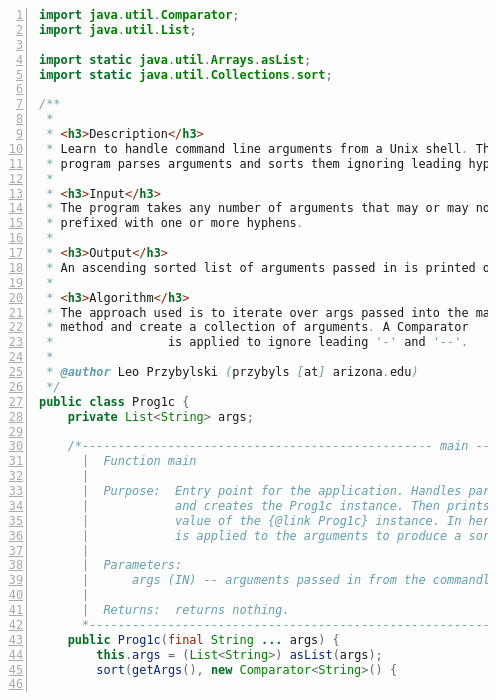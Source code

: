 \documentclass[11pt,notitlepage]{article}
\begin{document}
\begin{lstlisting}[numbers=left,language=java,basicstyle=\scriptsize,backgroundcolor=\color{ubergray},caption={trnapp-config.xml},frame=single,breaklines=true]
import java.util.Comparator;
import java.util.List;

import static java.util.Arrays.asList;
import static java.util.Collections.sort;

/**
 *
 * <h3>Description</h3>
 * Learn to handle command line arguments from a Unix shell. The
 * program parses arguments and sorts them ignoring leading hyphens
 *
 * <h3>Input</h3>  
 * The program takes any number of arguments that may or may not be
 * prefixed with one or more hyphens.
 *
 * <h3>Output</h3>  
 * An ascending sorted list of arguments passed in is printed out.
 *
 * <h3>Algorithm</h3>
 * The approach used is to iterate over args passed into the main
 * method and create a collection of arguments. A Comparator
 *                is applied to ignore leading '-' and '--'.
 *
 * @author Leo Przybylski (przybyls [at] arizona.edu)
 */
public class Prog1c {
    private List<String> args;
    
    /*------------------------------------------------- main -----
      |  Function main
      |
      |  Purpose:  Entry point for the application. Handles parsing of arguments
      |            and creates the Prog1c instance. Then prints the {@link String}
      |            value of the {@link Prog1c} instance. In here a {@link Comparator}
      |            is applied to the arguments to produce a sorted {@link List}
      |
      |  Parameters:
      |      args (IN) -- arguments passed in from the commandline
      |
      |  Returns:  returns nothing.
      *-------------------------------------------------------------------*/
    public Prog1c(final String ... args) {
        this.args = (List<String>) asList(args);
        sort(getArgs(), new Comparator<String>() {
                

\end{lstlisting}
\end{document}
